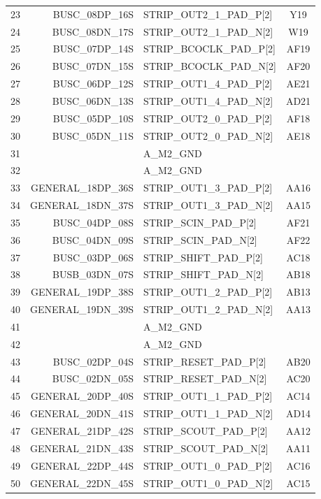\documentclass[11pt]{article}
\begin{document}
\begin{table}
\begin{center}
\begin{tabular}{|c|r|l|c|}
23 &    BUSC\_08DP\_16S &  STRIP\_OUT2\_1\_PAD\_P[2]   & Y19 \\
24 &    BUSC\_08DN\_17S &  STRIP\_OUT2\_1\_PAD\_N[2]   & W19 \\ \hline
25 &    BUSC\_07DP\_14S &  STRIP\_BCOCLK\_PAD\_P[2]   & AF19 \\
26 &    BUSC\_07DN\_15S &  STRIP\_BCOCLK\_PAD\_N[2]   & AF20 \\ \hline
27 &    BUSC\_06DP\_12S &  STRIP\_OUT1\_4\_PAD\_P[2]   & AE21 \\
28 &    BUSC\_06DN\_13S &  STRIP\_OUT1\_4\_PAD\_N[2]   & AD21 \\ \hline
29 &    BUSC\_05DP\_10S &  STRIP\_OUT2\_0\_PAD\_P[2]   & AF18 \\
30 &    BUSC\_05DN\_11S &  STRIP\_OUT2\_0\_PAD\_N[2]   & AE18 \\ \hline
31 &                  &  A\_M2\_GND               & \\
32 &                  &  A\_M2\_GND               & \\ \hline
33 & GENERAL\_18DP\_36S &  STRIP\_OUT1\_3\_PAD\_P[2]   & AA16 \\
34 & GENERAL\_18DN\_37S &  STRIP\_OUT1\_3\_PAD\_N[2]   & AA15 \\ \hline
35 &    BUSC\_04DP\_08S &  STRIP\_SCIN\_PAD\_P[2]     & AF21 \\
36 &    BUSC\_04DN\_09S &  STRIP\_SCIN\_PAD\_N[2]     & AF22 \\ \hline
37 &    BUSC\_03DP\_06S &  STRIP\_SHIFT\_PAD\_P[2]    & AC18 \\
38 &    BUSB\_03DN\_07S &  STRIP\_SHIFT\_PAD\_N[2]    & AB18 \\ \hline
39 & GENERAL\_19DP\_38S &  STRIP\_OUT1\_2\_PAD\_P[2]   & AB13 \\
40 & GENERAL\_19DN\_39S &  STRIP\_OUT1\_2\_PAD\_N[2]   & AA13 \\ \hline
41 &                  &  A\_M2\_GND               & \\
42 &                  &  A\_M2\_GND               & \\ \hline
43 &    BUSC\_02DP\_04S &  STRIP\_RESET\_PAD\_P[2]    & AB20 \\
44 &    BUSC\_02DN\_05S &  STRIP\_RESET\_PAD\_N[2]    & AC20 \\ \hline
45 & GENERAL\_20DP\_40S &  STRIP\_OUT1\_1\_PAD\_P[2]   & AC14 \\
46 & GENERAL\_20DN\_41S &  STRIP\_OUT1\_1\_PAD\_N[2]   & AD14 \\ \hline
47 & GENERAL\_21DP\_42S &  STRIP\_SCOUT\_PAD\_P[2]    & AA12 \\
48 & GENERAL\_21DN\_43S &  STRIP\_SCOUT\_PAD\_N[2]    & AA11 \\ \hline
49 & GENERAL\_22DP\_44S &  STRIP\_OUT1\_0\_PAD\_P[2]   & AC16 \\ 
50 & GENERAL\_22DN\_45S &  STRIP\_OUT1\_0\_PAD\_N[2]   & AC15 \\ \hline
\end{tabular}
\end{center}
\end{table}
\end{document}
